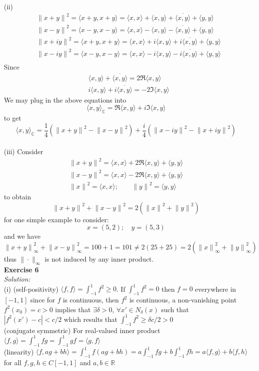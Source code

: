 \documentclass[12pt]{article}
\def\dotp#1#2{\langle#1,#2\rangle}
\def\es#1{{\bf Exercise #1}\\{\it Solution:}\\}
\begin{document}
(ii)\begin{align*}
&{\|x+y\|}^2=\dotp {x+y}{x+y}=\dotp{x}{x}+\dotp{x}{y}+\overline{\dotp{x}{y}}+\dotp{y}{y}\\
&{\|x-y\|}^2=\dotp {x-y}{x-y}=\dotp{x}{x}-\dotp{x}{y}-\overline{\dotp{x}{y}}+\dotp{y}{y}\\
&{\|x+iy\|}^2=\dotp {x+y}{x+y}=\dotp{x}{x}+i\dotp{x}{y}+i\overline{\dotp{x}{y}}+\dotp{y}{y}\\
&{\|x-iy\|}^2=\dotp {x-y}{x-y}=\dotp{x}{x}-i\dotp{x}{y}-i\overline{\dotp{x}{y}}+\dotp{y}{y}\\
\end{align*}
Since
\begin{align*}
&\dotp{x}{y}+\overline{\dotp{x}{y}}=2\Re\dotp{x}{y}\\
&i\dotp{x}{y}+i\overline{\dotp{x}{y}}=-2\Im\dotp{x}{y}
\end{align*}
We may plug in the above equations into
\[
\dotp{x}{y}_{\mathbb{C}}=\Re\dotp{x}{y}+i\Im\dotp{x}{y}
\]
to get
\[
\dotp{x}{y}_{\mathbb{C}}=\frac{1}{4}({\|x+y\|}^2-{\|x-y\|}^2)+\frac{i}{4}({\|x-iy\|}^2-{\|x+iy\|}^2)
\]\\[0.5 em]
(iii) Consider 
\begin{align*}
{\|x+y\|}^2=\dotp{x}{x}+2\Re\dotp{x}{y}+\dotp{y}{y}\\
{\|x-y\|}^2=\dotp{x}{x}-2\Re\dotp{x}{y}+\dotp{y}{y}\\
{\|x\|}^2=\dotp{x}{x};\qquad{\|y\|}^2=\dotp{y}{y}
\end{align*}
to obtain 
\[
{\|x+y\|}^2+{\|x-y\|}^2=2({\|x\|}^2+{\|y\|}^2)
\]
for one simple example to consider:
\[
x=(5,2);\quad y=(5,3)
\]
and we have 
\[
{\|x+y\|}_{\infty}^2+{\|x-y\|}_{\infty}^2=100+1=101\neq2(25+25)=2({\|x\|}_{\infty}^2+{\|y\|}_{\infty}^2)
\]
thus $\|\cdot\|_{\infty}$ is not induced by any inner product.\\[1 em]
\es6
(i)  (self-positivity) $\dotp{f}{f}=\int_{-1}^1f^2\ge0$. If $\int_{-1}^1f^2=0$ then $f=0$ everywhere in $[-1,1]$ since for $f$ is continuous, then $f^2$ is continuous, a non-vanishing point $f^2(x_0)=c>0$ implies that $\exists\delta>0$, $\forall x'\in N_{\delta}(x)$ such that $|f^2(x')-c|<c/2$ which results that $\int_{-1}^1f^2\ge\delta c/2>0$\\
(conjugate symmetric) For real-valued inner product $\dotp{f}{g}=\int_{-1}^1fg=\int_{-1}^1gf=\dotp{g}{f}$\\
(linearity) $\dotp{f}{ag+bh}=\int_{-1}^1f(ag+bh)=a\int_{-1}^1fg+b\int_{-1}^1fh=a\dotp{f}{g}+b\dotp{f}{h}$ for all $f,g,h\in C[-1,1]$ and $a,b\in\mathbb{R}$\\[0.5 em]
\end{document}
